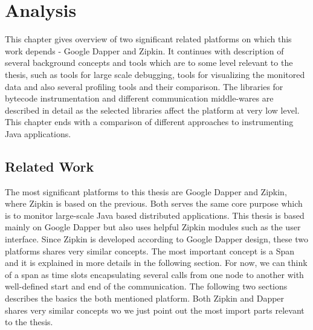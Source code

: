 \chapter{Analysis}
This chapter gives overview of two significant related platforms on which this work depends - Google Dapper and Zipkin. It continues with description of several background concepts and tools which are to some level relevant to the thesis, such as tools for large scale debugging, tools for visualizing the monitored data and also several profiling tools and their comparison. The libraries for bytecode instrumentation and different communication middle-wares are described in detail as the selected libraries affect the platform at very low level. This chapter ends with a comparison of different approaches to instrumenting Java applications.
\section{Related Work}
The most significant platforms to this thesis are Google Dapper and Zipkin, where Zipkin is based on the previous. Both serves the same core purpose which is to monitor large-scale Java based distributed applications. This thesis is based mainly on Google Dapper but also uses helpful Zipkin modules such as the user interface. Since Zipkin is developed according to Google Dapper design, these two platforms shares very similar concepts. The most important concept is a Span and it is explained in more details in the  following section. For now, we can think of a span as time slots encapsulating several calls from one node to another with well-defined start and end of the communication. The following two sections describes the basics the both mentioned platform. Both Zipkin and Dapper shares very similar concepts wo we just point out the most import parts relevant to the thesis.
